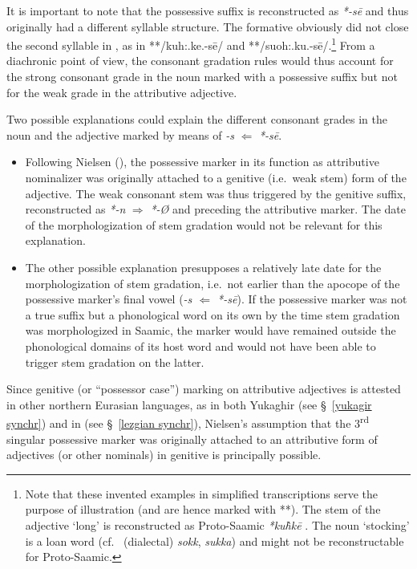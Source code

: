 {It is important to note that the possessive suffix is reconstructed as  \textit{*-sē} \cite[73]{sammallahti1998b} and thus originally had a different syllable structure. The formative obviously did not close the second syllable in , as in **/kuh:.ke.-sē/ and **/suoh:.ku.-sē/.\footnote{Note that these invented examples in simplified transcriptions serve the purpose of illustration (and are hence marked with **). The stem of the adjective ‘long’ is reconstructed as Proto\hyp{}Saamic \textit{*ku\`{h}kē} \cite[246]{sammallahti1998b}. The noun ‘stocking’ is a loan word (cf.~ (dialectal) \textit{sokk},  \textit{sukka}) and might not be reconstructable for Proto\hyp{}Saamic.} From a diachronic point of view, the consonant gradation rules would thus account for the strong consonant grade in the noun marked with a possessive suffix but not for the weak grade in the attributive adjective.
 
Two possible explanations could explain the different consonant grades in the noun and the adjective marked by means of \textit{-s} $\Leftarrow$ \textit{*-sē}.
\begin{itemize}
\item Following Nielsen (\citeyear{nielsen1945b}), the possessive marker in its function as attributive nominalizer was originally attached to a genitive (i.e.~weak stem) form of the adjective. The weak consonant stem was thus triggered by the genitive suffix, reconstructed as  \textit{*-n} $\Rightarrow$  \mbox{\textit{*-Ø}} \cite[65]{sammallahti1998b} and preceding the attributive marker. The date of the morphologization of stem gradation would not be relevant for this explanation.
\item The other possible explanation presupposes a relatively late date for the morphologization of stem gradation, i.e.~not earlier than the apocope of the possessive marker's final vowel (\textit{-s $\Leftarrow$ *-sē}). If the possessive marker was not a true suffix but a phonological word on its own by the time stem gradation was morphologized in Saamic, the marker would have remained outside the phonological domains of its host word and would not have been able to trigger stem gradation on the latter. 
\end{itemize}
Since genitive (or “possessor case”) marking on attributive adjectives is attested in other northern Eurasian languages, as in both Yukaghir (see \S~\ref{yukagir synchr}) and in  (see \S~\ref{lezgian synchr}), Nielsen's assumption that the 3\textsuperscript{rd} singular possessive marker was originally attached to an attributive form of adjectives (or other nominals) in genitive is principally possible.

}
